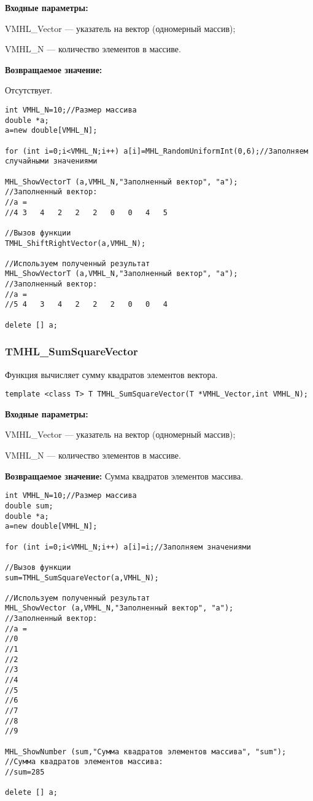 \documentclass[a4paper,12pt]{article}
\begin{document}
\textbf{Входные параметры:}

 VMHL\_Vector --- указатель на вектор (одномерный массив);
 
 VMHL\_N --- количество элементов в массиве.

\textbf{Возвращаемое значение:}

Отсутствует.


\begin{lstlisting}[label=code_use_TMHL_ShiftRightVector,caption=Пример использования]
int VMHL_N=10;//Размер массива
double *a;
a=new double[VMHL_N];

for (int i=0;i<VMHL_N;i++) a[i]=MHL_RandomUniformInt(0,6);//Заполняем случайными значениями

MHL_ShowVectorT (a,VMHL_N,"Заполненный вектор", "a");
//Заполненный вектор:
//a =	  
//4	3	4	2	2	2	0	0	4	5

//Вызов функции
TMHL_ShiftRightVector(a,VMHL_N);

//Используем полученный результат
MHL_ShowVectorT (a,VMHL_N,"Заполненный вектор", "a");
//Заполненный вектор:
//a =	 
//5	4	3	4	2	2	2	0	0	4

delete [] a;
\end{lstlisting}

\subsubsection{TMHL\_SumSquareVector}\label{TMHL_SumSquareVector}

Функция вычисляет сумму квадратов элементов вектора.


\begin{lstlisting}[label=code_syntax_TMHL_SumSquareVector,caption=Синтаксис]
template <class T> T TMHL_SumSquareVector(T *VMHL_Vector,int VMHL_N);
\end{lstlisting}

\textbf{Входные параметры:}

 VMHL\_Vector --- указатель на вектор (одномерный массив);
 
 VMHL\_N --- количество элементов в массиве.

\textbf{Возвращаемое значение:}
Сумма квадратов элементов массива.


\begin{lstlisting}[label=code_use_TMHL_SumSquareVector,caption=Пример использования]
int VMHL_N=10;//Размер массива
double sum;
double *a;
a=new double[VMHL_N];

for (int i=0;i<VMHL_N;i++) a[i]=i;//Заполняем значениями

//Вызов функции
sum=TMHL_SumSquareVector(a,VMHL_N);

//Используем полученный результат
MHL_ShowVector (a,VMHL_N,"Заполненный вектор", "a");
//Заполненный вектор:
//a =
//0
//1
//2
//3
//4
//5
//6
//7
//8
//9

MHL_ShowNumber (sum,"Сумма квадратов элементов массива", "sum");
//Сумма квадратов элементов массива:
//sum=285

delete [] a;
\end{lstlisting}
\end{document}
